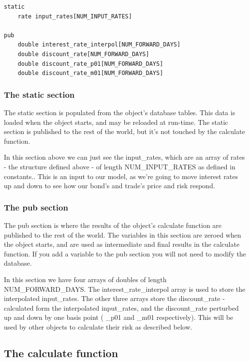 \documentclass{report}
\begin{document}
\begin{verbatim}
static
    rate input_rates[NUM_INPUT_RATES]

pub
    double interest_rate_interpol[NUM_FORWARD_DAYS]
    double discount_rate[NUM_FORWARD_DAYS]
    double discount_rate_p01[NUM_FORWARD_DAYS]
    double discount_rate_m01[NUM_FORWARD_DAYS]
\end{verbatim}

\subsubsection{The static section}

The static section is populated from the object's database tables. This data is loaded when the object starts, and may be reloaded at run-time. The static section is published to the rest of the world, but it's not touched by the calculate function.

In this section above we can just see the input_rates, which are an array of rates - the structure defined above - of length NUM_INPUT_RATES as defined in constants.. This is an input to our model, as we're going to move interest rates up and down to see how our bond's and trade's price and risk respond. 

\subsubsection{The pub section}

The pub section is where the results of the object's calculate function are published to the rest of the world. The variables in this section are zeroed when the object starts, and are used as intermediate and final results in the calculate function. If you add a variable to the pub section you will not need to modify the database.

In this section we have four arrays of doubles of length NUM_FORWARD_DAYS. The interest_rate_interpol array is used to store the interpolated input_rates. The other three arrays store the discount_rate - calculated form the interpolated input_rates, and the discount_rate perturbed up and down by one basis point ( _p01 and _m01 respectively). This will be used by other objects to calculate their risk as described below.

\subsection{The calculate function}
\end{document}
